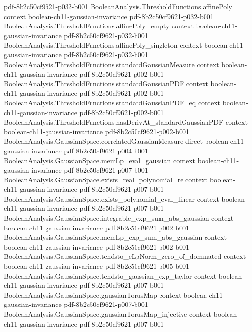 \begin{lemma}
  {pdf-8b2c50cf9621-p032-b001}
\proofstep
  {BooleanAnalysis.ThresholdFunctions.affinePoly}
  {context}
  {boolean-ch11-gaussian-invariance}
  {pdf-8b2c50cf9621-p032-b001}
\proofstep
  {BooleanAnalysis.ThresholdFunctions.affinePoly_empty}
  {context}
  {boolean-ch11-gaussian-invariance}
  {pdf-8b2c50cf9621-p032-b001}
\proofstep
  {BooleanAnalysis.ThresholdFunctions.affinePoly_singleton}
  {context}
  {boolean-ch11-gaussian-invariance}
  {pdf-8b2c50cf9621-p032-b001}
\proofstep
  {BooleanAnalysis.ThresholdFunctions.standardGaussianMeasure}
  {context}
  {boolean-ch11-gaussian-invariance}
  {pdf-8b2c50cf9621-p002-b001}
\proofstep
  {BooleanAnalysis.ThresholdFunctions.standardGaussianPDF}
  {context}
  {boolean-ch11-gaussian-invariance}
  {pdf-8b2c50cf9621-p002-b001}
\proofstep
  {BooleanAnalysis.ThresholdFunctions.standardGaussianPDF_eq}
  {context}
  {boolean-ch11-gaussian-invariance}
  {pdf-8b2c50cf9621-p002-b001}
\proofstep
  {BooleanAnalysis.ThresholdFunctions.hasDerivAt_standardGaussianPDF}
  {context}
  {boolean-ch11-gaussian-invariance}
  {pdf-8b2c50cf9621-p002-b001}
\proofstep
  {BooleanAnalysis.GaussianSpace.correlatedGaussianMeasure}
  {direct}
  {boolean-ch11-gaussian-invariance}
  {pdf-8b2c50cf9621-p004-b001}
\proofstep
  {BooleanAnalysis.GaussianSpace.memLp_eval_gaussian}
  {context}
  {boolean-ch11-gaussian-invariance}
  {pdf-8b2c50cf9621-p007-b001}
\proofstep
  {BooleanAnalysis.GaussianSpace.exists_real_polynomial_re}
  {context}
  {boolean-ch11-gaussian-invariance}
  {pdf-8b2c50cf9621-p007-b001}
\proofstep
  {BooleanAnalysis.GaussianSpace.exists_polynomial_eval_linear}
  {context}
  {boolean-ch11-gaussian-invariance}
  {pdf-8b2c50cf9621-p007-b001}
\proofstep
  {BooleanAnalysis.GaussianSpace.integrable_exp_sum_abs_gaussian}
  {context}
  {boolean-ch11-gaussian-invariance}
  {pdf-8b2c50cf9621-p002-b001}
\proofstep
  {BooleanAnalysis.GaussianSpace.memLp_exp_sum_abs_gaussian}
  {context}
  {boolean-ch11-gaussian-invariance}
  {pdf-8b2c50cf9621-p002-b001}
\proofstep
  {BooleanAnalysis.GaussianSpace.tendsto_eLpNorm_zero_of_dominated}
  {context}
  {boolean-ch11-gaussian-invariance}
  {pdf-8b2c50cf9621-p005-b001}
\proofstep
  {BooleanAnalysis.GaussianSpace.tendsto_gaussian_exp_taylor}
  {context}
  {boolean-ch11-gaussian-invariance}
  {pdf-8b2c50cf9621-p007-b001}
\proofstep
  {BooleanAnalysis.GaussianSpace.gaussianTorusMap}
  {context}
  {boolean-ch11-gaussian-invariance}
  {pdf-8b2c50cf9621-p007-b001}
\proofstep
  {BooleanAnalysis.GaussianSpace.gaussianTorusMap_injective}
  {context}
  {boolean-ch11-gaussian-invariance}
  {pdf-8b2c50cf9621-p007-b001}

\end{lemma}
